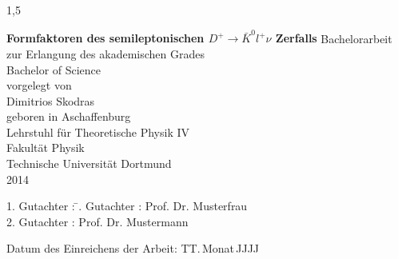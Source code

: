 \documentclass[11pt,a4paper,twoside]{report}
\begin{document}
\begin{spacing}{1,5}

%
%


\newcommand{\thetitle}{Formfaktoren des semileptonischen $D^+ \rightarrow \bar K^0 l^+ \nu$ Zerfalls}

\thispagestyle{empty}
\begin{center}
\Huge\textbf{\thetitle}
\vfill
\vfill
\Large
Bachelorarbeit \\ zur Erlangung des akademischen Grades \\ Bachelor of Science \\
\vspace{20pt}
\normalsize
vorgelegt von \\[5pt]
{\Large Dimitrios Skodras} \\[5pt]
geboren in Aschaffenburg \\
\vspace{20pt}
Lehrstuhl für Theoretische Physik IV \\ Fakultät Physik \\
Technische Universität Dortmund \\ 2014
\end{center}
\newpage


\thispagestyle{empty}
\vspace*{\fill}
\begin{tabbing}
1. Gutachter : \=. Gutachter : \>Prof. Dr. Musterfrau \\[11pt]
2. Gutachter : \>Prof. Dr. Mustermann \\[11pt]
\end{tabbing}
\vspace{11pt}
Datum des Einreichens der Arbeit: TT.\,Monat\,JJJJ
\newpage


\end{spacing}
\end{document}
